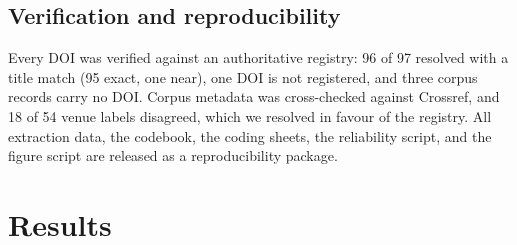 \documentclass[preprint,12pt]{elsarticle}
\renewcommand{\_}{\plainunderscore\allowbreak}
\begin{document}
\subsection{Verification and reproducibility}

Every DOI was verified against an authoritative registry: 96 of 97 resolved with a
title match (95 exact, one near), one DOI is not registered, and three corpus records carry no
DOI. Corpus metadata was cross-checked against Crossref, and 18 of 54 venue labels disagreed,
which we resolved in favour of the registry. All extraction data, the codebook, the coding
sheets, the reliability script, and the figure script are released as a reproducibility package.

\section{Results}\label{sec:results}
\end{document}
